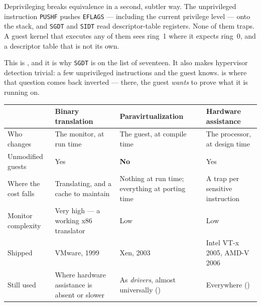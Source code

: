 \begin{alertbox}
Deprivileging breaks equivalence in a second, subtler way. The unprivileged
instruction \texttt{PUSHF} pushes \texttt{EFLAGS} --- including the current
privilege level --- onto the stack, and \texttt{SGDT} and \texttt{SIDT} read
descriptor-table registers. None of them traps. A guest kernel that executes
any of them sees ring~1 where it expects ring~0, and a descriptor table that is
not its own.

\smallskip
This is , and it is why \texttt{SGDT} is on the list of
seventeen. It also makes hypervisor detection trivial: a few unprivileged
instructions and the guest knows.  is where that question
comes back inverted --- there, the guest \emph{wants} to prove what it is
running on.
\end{alertbox}

\begin{longtable}{@{}L{3.3cm}L{3.8cm}L{3.8cm}L{3.8cm}@{}}
\toprule
{}
& \textbf{Binary translation} & \textbf{Paravirtualization} &
\textbf{Hardware assistance} \\
\midrule
\endhead
Who changes & The monitor, at run time & The guest, at compile time & The
processor, at design time \\
Unmodified guests & Yes & \textbf{No} & Yes \\
Where the cost falls & Translating, and a cache to maintain & Nothing at run
time; everything at porting time & A trap per sensitive instruction \\
Monitor complexity & Very high --- a working x86 translator & Low & Low \\
Shipped & VMware, 1999 & Xen, 2003 & Intel VT-x 2005, AMD-V 2006 \\
Still used & Where hardware assistance is absent or slower & As \emph{drivers},
almost universally () & Everywhere () \\
\bottomrule
\end{longtable}


